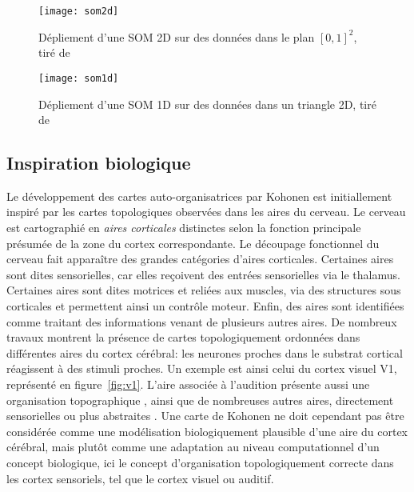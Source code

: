 \documentclass[../main]{subfiles}
\begin{document}
\begin{figure}
\centering
\texttt{[image: som2d]}
\caption{Dépliement d'une SOM 2D sur des données dans le plan $[0,1]^2$, tiré de~\cite{Kohonen1995SelfOrganizingM} \label{fig:som2d}}

\end{figure}

\begin{figure}
\centering
\texttt{[image: som1d]}
\caption{Dépliement d'une SOM 1D sur des données dans un triangle 2D, tiré de~\cite{Kohonen1995SelfOrganizingM}\label{fig:som1d}}

\end{figure}


\subsection{Inspiration biologique}


Le développement des cartes auto-organisatrices par Kohonen est initiallement inspiré par les cartes topologiques observées dans les aires du cerveau. 
Le cerveau est cartographié en \emph{aires corticales} distinctes selon la fonction principale présumée de la zone du cortex correspondante.
Le découpage fonctionnel du cerveau fait apparaître des grandes catégories d'aires corticales. Certaines aires sont dites sensorielles, car elles reçoivent des entrées sensorielles via le thalamus. Certaines aires sont dites motrices et reliées aux muscles, via des structures sous corticales et permettent ainsi un contrôle moteur.
Enfin, des aires sont identifiées comme traitant des informations venant de plusieurs autres aires.
De nombreux travaux montrent la présence de cartes topologiquement ordonnées dans différentes aires du cortex cérébral: les neurones proches dans le substrat cortical réagissent à des stimuli proches. 
Un exemple est ainsi celui du cortex visuel V1, représenté en figure~\ref{fig:v1}. 
L'aire associée à l'audition présente aussi une organisation topographique \cite{Reale1980TonotopicOI}, ainsi que de nombreuses autres aires, directement sensorielles ou plus abstraites \cite{Kohonen1995SelfOrganizingM}. 
Une carte de Kohonen ne doit cependant pas être considérée comme une modélisation biologiquement plausible d'une aire du cortex cérébral, mais plutôt comme une adaptation au niveau computationnel d'un concept biologique, ici le concept d'organisation topologiquement correcte dans les cortex sensoriels, tel que le cortex visuel ou auditif.
\end{document}
